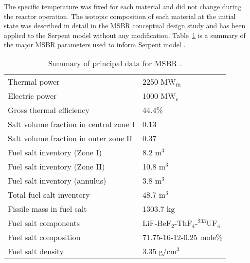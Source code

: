 The specific temperature was fixed for each material and did not change during 
the reactor operation. The isotopic composition of each material at the 
initial state was described in detail in the MSBR conceptual design study 
\cite{robertson_conceptual_1971} and has been applied to the Serpent model 
without any modification. Table~\ref{tab:msbr_tab} is a summary of the major 
\gls{MSBR} parameters used to inform Serpent model  
\cite{robertson_conceptual_1971}. 
\begin{table}[h!]
	\caption{Summary of principal data for \gls{MSBR} 
		\cite{robertson_conceptual_1971}.}
	\begin{tabularx}{\textwidth}{ X  X}
		\hline
		Thermal power           		& 2250 MW$_{th}$		\\
		Electric power             		& 1000 MW$_e$           \\
		Gross thermal efficiency       	& 44.4\%         		\\
		Salt volume fraction in central zone I		& 0.13   	\\
		Salt volume fraction in outer zone II       & 0.37		\\
		Fuel salt inventory (Zone I)                & 8.2 m$^3$	\\
		Fuel salt inventory (Zone II)               & 10.8 m$^3$\\
		Fuel salt inventory (annulus)               & 3.8 m$^3$	\\
		Total fuel salt inventory                   & 48.7 m$^3$\\
		Fissile mass in fuel salt                   & 1303.7 kg	\\
		Fuel salt components   	& LiF-BeF$_2$-ThF$_4$-$^{233}$UF$_4$	\\  
		Fuel salt composition   & 71.75-16-12-0.25 mole\%		\\
		Fuel salt density       & 3.35 g/cm$^3$         		\\ \hline
	\end{tabularx}
	\label{tab:msbr_tab}
\end{table}

